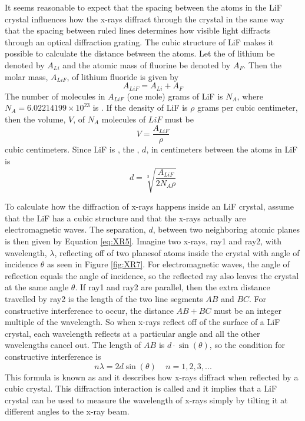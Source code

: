 \documentclass[12pt, a4paper, oneside, openright, titlepage]{book}
\begin{document}
\noindent It seems reasonable to expect that the spacing between the atoms in the LiF crystal influences how the x-rays diffract through the crystal in the same way that the spacing between ruled lines determines how visible light diffracts through an optical diffraction grating. The cubic structure of LiF makes it possible to calculate the distance between the atoms. Let the  of lithium be denoted by $A_{Li}$ and the atomic mass of fluorine be denoted by $A_F$. Then the molar mass, $A_{LiF}$, of lithium fluoride is given by\begin{equation}\label{eq:XR3}
    A_{LiF} = A_{Li} + A_F
\end{equation}
The number of molecules in $A_{LiF}$ (one mole) grams of LiF is $N_A$, where $N_A = 6.02214199\times 10^{23}$ is . If the density of LiF is $\rho$ grams per cubic centimeter, then the volume, $V$, of $N_A$ molecules of $LiF$ must be \begin{equation}\label{eq:XR4}
    V = \frac{A_{LiF}}{\rho}
\end{equation}
cubic centimeters. Since LiF is , the , $d$, in centimeters between the atoms in LiF is \begin{equation}\label{eq:XR5}
    d = \sqrt[3]{\frac{A_{LiF}}{2N_A\rho}}
\end{equation}

\noindent To calculate how the diffraction of x-rays happens inside an LiF crystal, assume that the LiF has a cubic structure and that the x-rays actually are electromagnetic waves. The separation, $d$, between two neighboring atomic planes is then given by Equation \ref{eq:XR5}. Imagine two x-rays, ray1 and ray2, with wavelength, $\lambda$, reflecting off of two planesof atoms inside the crystal with angle of incidence $\theta$ as seen in Figure \ref{fig:XR7}. For electromagnetic waves, the angle of reflection equals the angle of incidence, so the reflected ray also leaves the crystal at the same angle $\theta$. If ray1 and ray2 are parallel, then the extra distance travelled by ray2 is the length of the two line segments $AB$ and $BC$. For constructive interference to occur, the distance $AB+BC$ must be an integer multiple of the wavelength. So when x-rays reflect off of the surface of a LiF crystal, each wavelength reflects at a particular angle and all the other wavelengths cancel out. The length of $AB$ is $d\cdot \sin(\theta)$, so the condition for constructive interference is \begin{equation}\label{eq:XR6}
    n\lambda = 2d\sin(\theta)\;\;\;\;n=1,2,3,...
\end{equation}
This formula is known as  and it describes how x-rays diffract when reflected by a cubic crystal. This diffraction interaction is called  and it implies that a LiF crystal can be used to measure the wavelength of x-rays simply by tilting it at different angles to the x-ray beam.
\end{document}
